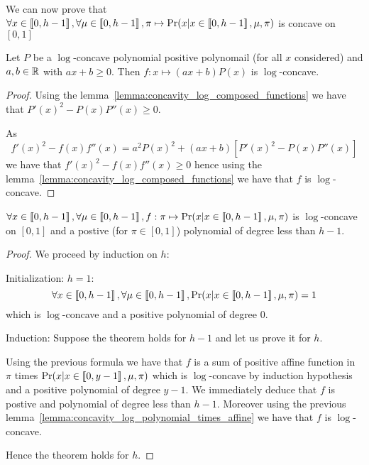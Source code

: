 We can now prove that $\forall x \in \left\llbracket0, h - 1\right\rrbracket, \forall \mu \in \left\llbracket0, h - 1\right\rrbracket, \pi \mapsto \Pr(x | x \in \left\llbracket0, h - 1\right\rrbracket, \mu, \pi)$ is concave on $[0, 1]$


\begin{lemma}
    \label{lemma:concavity_log_polynomial_times_affine}
    Let $P$ be a $\log$-concave polynomial positive polynomail (for all $x$ considered) and $a, b \in \mathbb{R}$ with $ax + b \geq 0$. Then $f: x \mapsto (ax + b)P(x)$ is $\log$-concave.
\end{lemma}
\begin{proof}
    Using the lemma~\ref{lemma:concavity_log_composed_functions} we have that $P'(x)^2 - P(x)P''(x) \geq 0$.
    
    As
    \[f'(x)^2 - f(x) f''(x) = a^2 P(x)^2 + (ax + b) \left[ P'(x)^2 - P(x)P''(x) \right] \] 
    we have that $f'(x)^2 - f(x) f''(x) \geq 0$ hence using the lemma~\ref{lemma:concavity_log_composed_functions} we have that $f$ is $\log$-concave.
\end{proof}


\begin{thm}
    $\forall x \in \left\llbracket0, h - 1\right\rrbracket, \forall \mu \in \left\llbracket0, h - 1\right\rrbracket, f: \pi \mapsto \Pr(x | x \in \left\llbracket0, h - 1\right\rrbracket, \mu, \pi)$ is $\log$-concave on $[0, 1]$ and a postive (for $\pi \in [0, 1]$) polynomial of degree less than $h - 1$.
\end{thm}
\begin{proof}
    We proceed by induction on $h$:

    Initialization: $h = 1$: 
    \[ \forall x \in \left\llbracket0, h - 1\right\rrbracket, \forall \mu \in \left\llbracket0, h - 1\right\rrbracket, \Pr(x | x \in \left\llbracket0, h - 1\right\rrbracket, \mu, \pi) = 1\] which is $\log$-concave and a positive polynomial of degree $0$.

    Induction: Suppose the theorem holds for $h - 1$ and let us prove it for $h$.

    Using the previous formula we have that $f$ is a sum of positive affine function in $\pi$ times $\Pr(x | x \in \left\llbracket0, y - 1\right\rrbracket, \mu, \pi)$ which is $\log$-concave by induction hypothesis and a positive polynomial of degree $y - 1$. We immediately deduce that $f$ is postive and polynomial of degree less than $h - 1$. Moreover using the previous lemma~\ref{lemma:concavity_log_polynomial_times_affine} we have that $f$ is $\log$-concave.

    Hence the theorem holds for $h$.
\end{proof}
